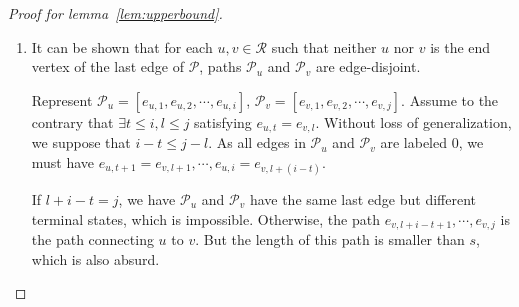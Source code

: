 \begin{proof}[Proof for lemma~\ref{lem:upperbound}]
\begin{enumerate}
            If $l=s-j$, the proof is done. Otherwise, it's obvious that $$a_{l}\cdots a_{2}a_{1}0^{j}1x1_{t}0^{s-l}$$ is balance, hence, by claim \ref{claim:balance_ver}, it also has at least $1$ in-edge not lying in $\mathscr{P}$, and one can continue adding such edge to the head of $\mathcal{P}_{v}$.
            
        \item It can be shown that for each $u,v\in\mathscr{R}$ such that neither $u$ nor $v$ is the end vertex of the last edge of $\mathscr{P}$, paths $\mathcal{P}_{u}$ and $\mathcal{P}_{v}$ are edge-disjoint.
    
            Represent $\mathcal{P}_{u} = [e_{u,1},e_{u,2},\cdots,e_{u,i}]$, $\mathcal{P}_{v}=[e_{v,1},e_{v,2},\cdots,e_{v,j}]$. Assume to the contrary that $\exists t\leq i,l\leq j$ satisfying $e_{u,t}=e_{v,l}$. Without loss of generalization, we suppose that $i-t\leq j-l$. As all edges in $\mathcal{P}_{u}$ and $\mathcal{P}_{v}$ are labeled $0$, we must have $e_{u,t+1}=e_{v,l+1},\cdots,e_{u,i}=e_{v,l+(i-t)}$. 
            
            If $l+i-t=j$, we have $\mathcal{P}_{u}$ and $\mathcal{P}_{v}$ have the same last edge but different terminal states, which is impossible. Otherwise, the path $e_{v,l+i-t+1},\cdots,e_{v,j}$ is the path connecting $u$ to $v$. But the length of this path is smaller than $s$, which is also absurd.
    \end{enumerate}
    
    
    
    

\end{proof}
